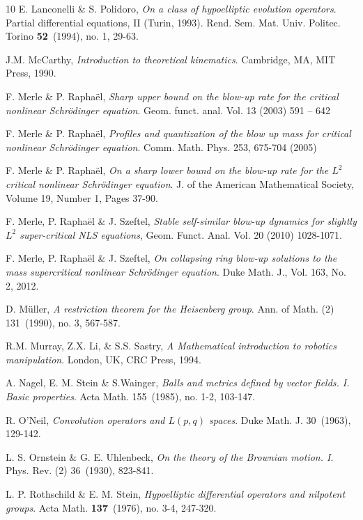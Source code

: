 \documentclass[11pt,letter]{amsart}
\numberwithin{equation}{section}
\numberwithin{equation}{section}
\begin{document}
\begin{thebibliography}{10}
E. Lanconelli \& S. Polidoro, \emph{On a class of hypoelliptic evolution operators}. Partial differential equations, II (Turin, 1993). Rend. Sem. Mat. Univ. Politec. Torino \textbf{52}~(1994), no. 1, 29-63.

J.M. McCarthy, \emph{Introduction to theoretical kinematics}. Cambridge, MA, MIT Press, 1990. 

F. Merle \& P. Rapha\"el, \emph{Sharp upper bound on the blow-up rate for the critical nonlinear Schr\"odinger equation}. Geom. funct. anal.
Vol. 13 (2003) 591 – 642

F. Merle \& P. Rapha\"el, \emph{Profiles and quantization of the blow up mass for critical nonlinear Schr\"odinger equation}. Comm. Math. Phys. 253, 675-704 (2005)

F. Merle \& P. Rapha\"el, \emph{On a sharp lower bound on the blow-up rate for the $L^{2}$ critical nonlinear Schr\"odinger equation}. J. of the American Mathematical Society,
Volume 19, Number 1, Pages 37-90.

 F. Merle, P. Rapha\"el \& J. Szeftel, \emph{Stable self-similar blow-up dynamics for slightly $L^{2}$ super-critical NLS equations}, Geom. Funct. Anal. Vol. 20 (2010) 1028-1071.

F. Merle, P. Rapha\"el \& J. Szeftel, \emph{On collapsing ring blow-up solutions to the mass supercritical nonlinear Schr\"odinger equation}.	Duke Math. J.,
Vol. 163, No. 2, 2012.

D. M\"uller, \emph{A restriction theorem for the Heisenberg group}.
Ann. of Math. (2) 131~(1990), no. 3, 567-587.

R.M. Murray, Z.X. Li, \& S.S. Sastry,  \emph{A Mathematical introduction to robotics manipulation}. London, UK, CRC Press, 1994.  

A. Nagel, E. M. Stein \& S.Wainger, \emph{Balls and metrics defined by vector fields. I. Basic properties}.
Acta Math. 155~(1985), no. 1-2, 103-147.

R. O'Neil, \emph{Convolution operators and  $L(p,q)$ spaces}.
Duke Math. J. 30~(1963), 129-142.

L. S. Ornstein \& G. E. Uhlenbeck, \emph{On the theory of the Brownian motion. I}.
Phys. Rev. (2) 36~(1930), 823-841. 

L. P. Rothschild \& E. M. Stein, \emph{Hypoelliptic differential operators and nilpotent groups}. Acta Math. \textbf{137}~(1976), no. 3-4, 247-320. 


\end{thebibliography}
\end{document}
